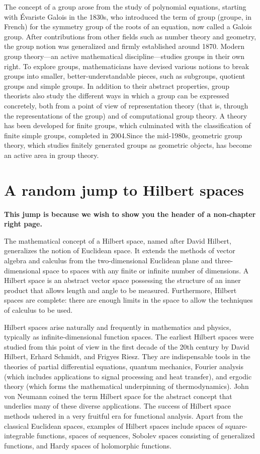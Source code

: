 The concept of a group arose from the study of polynomial equations, starting with Évariste Galois in the 1830s, who introduced the term of group (groupe, in French) for the symmetry group of the roots of an equation, now called a Galois group. After contributions from other fields such as number theory and geometry, the group notion was generalized and firmly established around 1870. Modern group theory—an active mathematical discipline—studies groups in their own right. To explore groups, mathematicians have devised various notions to break groups into smaller, better-understandable pieces, such as subgroups, quotient groups and simple groups. In addition to their abstract properties, group theorists also study the different ways in which a group can be expressed concretely, both from a point of view of representation theory (that is, through the representations of the group) and of computational group theory. A theory has been developed for finite groups, which culminated with the classification of finite simple groups, completed in 2004.Since the mid-1980s, geometric group theory, which studies finitely generated groups as geometric objects, has become an active area in group theory.

\section{A random jump to Hilbert spaces}

\textbf{This jump is because we wish to show you the header of a non-chapter right page.}

The mathematical concept of a Hilbert space, named after David Hilbert, generalizes the notion of Euclidean space. It extends the methods of vector algebra and calculus from the two-dimensional Euclidean plane and three-dimensional space to spaces with any finite or infinite number of dimensions. A Hilbert space is an abstract vector space possessing the structure of an inner product that allows length and angle to be measured. Furthermore, Hilbert spaces are complete: there are enough limits in the space to allow the techniques of calculus to be used.

Hilbert spaces arise naturally and frequently in mathematics and physics, typically as infinite-dimensional function spaces. The earliest Hilbert spaces were studied from this point of view in the first decade of the 20th century by David Hilbert, Erhard Schmidt, and Frigyes Riesz. They are indispensable tools in the theories of partial differential equations, quantum mechanics, Fourier analysis (which includes applications to signal processing and heat transfer), and ergodic theory (which forms the mathematical underpinning of thermodynamics). John von Neumann coined the term Hilbert space for the abstract concept that underlies many of these diverse applications. The success of Hilbert space methods ushered in a very fruitful era for functional analysis. Apart from the classical Euclidean spaces, examples of Hilbert spaces include spaces of square-integrable functions, spaces of sequences, Sobolev spaces consisting of generalized functions, and Hardy spaces of holomorphic functions.

